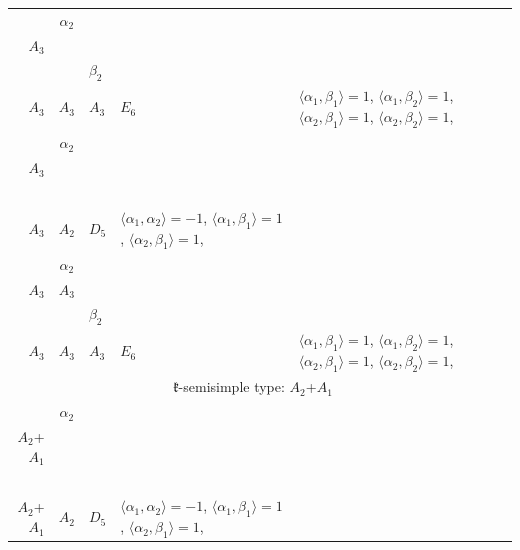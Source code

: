 \documentclass[12pt]{report}
\begin{document}
\begin{appendix}
{\begin{longtable}{rcl p{1cm}p{1cm}p{3cm} }
\\
\begin{tabular}{cc}$\alpha_1$+ & $\alpha_2$\\\tiny{ $A_3$ } & \tiny{  }\end{tabular} &\begin{tabular}{c} = \\~ \end{tabular} & \begin{tabular}{cc}$\beta_1$+ & $\beta_2$\\\tiny{ $A_3$ } & \tiny{ $A_3$ }\end{tabular} & $A_3$ & $E_6$ &  $\langle\alpha_1, \beta_1\rangle=1$, $\langle\alpha_1, \beta_2\rangle=1$, $\langle\alpha_2, \beta_1\rangle=1$, $\langle\alpha_2, \beta_2\rangle=1$, 
\\
\begin{tabular}{cc}$\alpha_1$+ & $\alpha_2$\\\tiny{ $A_3$ } & \tiny{  }\end{tabular} &\begin{tabular}{c} = \\~ \end{tabular} & \begin{tabular}{c}$\beta_1$\\\tiny{ $A_3$ }\end{tabular} & $A_2$ & $D_5$ & $\langle\alpha_1, \alpha_2\rangle=-1$,  $\langle\alpha_1, \beta_1\rangle=1$, $\langle\alpha_2, \beta_1\rangle=1$, 
\\
\begin{tabular}{cc}$\alpha_1$+ & $\alpha_2$\\\tiny{ $A_3$ } & \tiny{ $A_3$ }\end{tabular} &\begin{tabular}{c} = \\~ \end{tabular} & \begin{tabular}{cc}$\beta_1$+ & $\beta_2$\\\tiny{ $A_3$ } & \tiny{ $A_3$ }\end{tabular} & $A_3$ & $E_6$ &  $\langle\alpha_1, \beta_1\rangle=1$, $\langle\alpha_1, \beta_2\rangle=1$, $\langle\alpha_2, \beta_1\rangle=1$, $\langle\alpha_2, \beta_2\rangle=1$, 
\\
\hline\multicolumn{5}{c}{$\mathfrak{k}$-semisimple type: $A_2$+$A_1$}\\
\hline\hline\begin{tabular}{cc}$\alpha_1$+ & $\alpha_2$\\\tiny{ $A_2$+$A_1$ } & \tiny{  }\end{tabular} &\begin{tabular}{c} = \\~ \end{tabular} & \begin{tabular}{c}$\beta_1$\\\tiny{ $A_2$+$A_1$ }\end{tabular} & $A_2$ & $D_5$ & $\langle\alpha_1, \alpha_2\rangle=-1$,  $\langle\alpha_1, \beta_1\rangle=1$, $\langle\alpha_2, \beta_1\rangle=1$, 

\end{longtable}}
\end{appendix}
\end{document}
